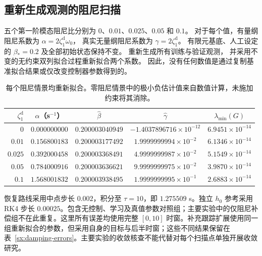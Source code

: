 \subsection{重新生成观测的阻尼扫描}
\label{sx:damping}
五个第一阶模态阻尼比分别为 $0$、$0.01$、$0.025$、$0.05$ 和 $0.1$。
对于每个值，有量纲阻尼系数为 $\alpha=2\zeta_1^{\mathrm{d}}\omega_0$，
真实无量纲阻尼系数为 $\gamma=2\zeta_1^{\mathrm{d}}$。
有限元基底、人工设定的 $\beta_*=0.2$ 及全部初始状态保持不变。
重新生成所有训练与验证观测，
并采用不变的无约束双列拟合过程重新拟合两个系数。
因此，没有任何数值是通过复制基准拟合结果或仅改变控制器参数得到的。

\begin{table}[t]
\centering
\caption{每个阻尼情景均重新拟合。零阻尼情景中的极小负估计值来自数值计算，未施加约束将其消除。}
\label{sx:damping-fit}
\setlength{\tabcolsep}{5pt}
\begin{tabular}{rcccc}
\toprule
$\zeta_1^{\mathrm{d}}$ & $\alpha$（s$^{-1}$） & $\widehat\beta$ & $\widehat\gamma$ & $\lambda_{\min}(G)$\\
\midrule
$0$ & $0.000000000$ & $0.200003040949$ & $-1.4037896716\times10^{-12}$ & $6.9451\times10^{-14}$ \\
$0.01$ & $0.156800183$ & $0.200003177492$ & $1.9999999994\times10^{-2}$ & $6.1346\times10^{-14}$ \\
$0.025$ & $0.392000458$ & $0.200003368491$ & $4.9999999987\times10^{-2}$ & $5.1549\times10^{-14}$ \\
$0.05$ & $0.784000916$ & $0.200003636621$ & $9.9999999975\times10^{-2}$ & $3.9870\times10^{-14}$ \\
$0.1$ & $1.568001832$ & $0.200003938495$ & $1.9999999995\times10^{-1}$ & $2.6883\times10^{-14}$ \\
\bottomrule
\end{tabular}
\end{table}

恢复路线采用中点步长 $0.002$，积分至 $\tau=10$，即 $1.275509$ s。独立 $h_0$ 参考采用 RK4 步长 $0.00025$。包含无控制、学习及真值参数对照组；主要实验中的仅阻尼补偿组不在此重复。这里所有误差均使用完整 $[0,10]$ 时窗。补充跟踪扩展使用同一组重新拟合的参数，但采用自身的目标与后半时窗；这些不同结果保留在表~\ref{sx:damping-errors}。主要实验的收敛核查不能代替对每个扫描点单独开展收敛研究。

